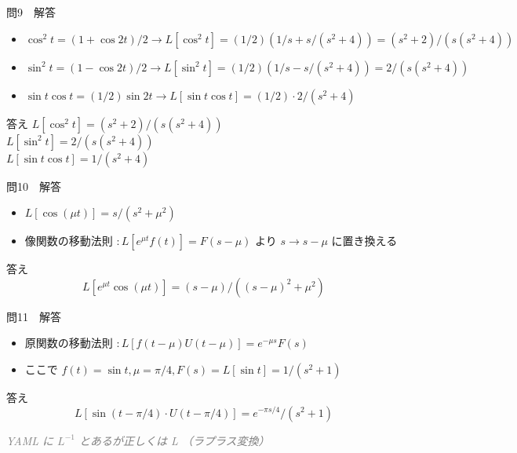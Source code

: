 \documentclass[aspectratio=43,professionalfonts,handout]{beamer}
\begin{document}
\begin{frame}{問9　解答}
  \begin{block}{}
  \begin{itemize}\setlength{\itemsep}{2pt}
    \item $\cos^{2}t = (1+\cos 2t)/2   \to   L[\cos^{2}t] = (1/2)(1/s + s/(s^{2}+4)) = (s^{2}+2)/(s(s^{2}+4))$
    \item $\sin^{2}t = (1-\cos 2t)/2   \to   L[\sin^{2}t] = (1/2)(1/s - s/(s^{2}+4)) = 2/(s(s^{2}+4))$
    \item $\sin t \cos t = (1/2)\sin 2t   \to   L[\sin t \cos t] = (1/2)\cdot2/(s^{2}+4)$
  \end{itemize}
  \end{block}
  \begin{exampleblock}{答え}
  $L[\cos^{2}t] = (s^{2}+2)/(s(s^{2}+4))$\\
  $L[\sin^{2}t] = 2/(s(s^{2}+4))$\\
  $L[\sin t \cos t] = 1/(s^{2}+4)$\\
  \end{exampleblock}
\end{frame}

\begin{frame}{問10　解答}
  \begin{block}{}
  \begin{itemize}\setlength{\itemsep}{2pt}
    \item $L[\cos(\mu t)] = s/(s^{2}+\mu^{2})$
    \item 像関数の移動法則 $: L[e^{\mu t}f(t)] = F(s-\mu)$ より $s \to s-\mu$ に置き換える
  \end{itemize}
  \end{block}
  \begin{exampleblock}{答え}
    \[
    L[e^{\mu t}\cos(\mu t)] = (s-\mu)/((s-\mu)^{2}+\mu^{2})
  \]
  \end{exampleblock}
\end{frame}

\begin{frame}{問11　解答}
  \begin{block}{}
  \begin{itemize}\setlength{\itemsep}{2pt}
    \item 原関数の移動法則 $: L[f(t-\mu)U(t-\mu)] = e^{-\mu s}F(s)$
    \item ここで $f(t) = \sin t, \mu = \pi/4, F(s) = L[\sin t] = 1/(s^{2}+1)$
  \end{itemize}
  \end{block}
  \begin{exampleblock}{答え}
    \[
    L[\sin(t-\pi/4)\cdot U(t-\pi/4)] = e^{-\pi s/4}/(s^{2}+1)
  \]
  \end{exampleblock}
  {\footnotesize \textcolor{gray}{\textit{YAML に $L^{-1}$ とあるが正しくは L （ラプラス変換）}}}
\end{frame}
\end{document}

